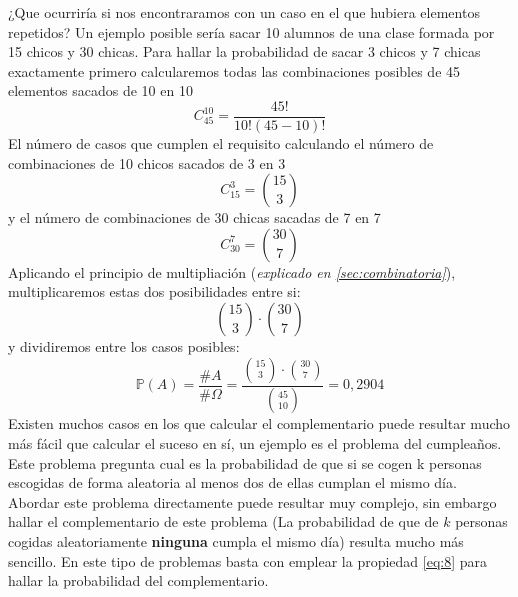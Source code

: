 \documentclass[11pt]{article}
\newcommand{\prob}{\mathbb{P}}
\newcommand{\OMG}{\varOmega}
\theoremstyle{plain}
\begin{document}
                 ¿Que ocurriría si nos encontraramos con un caso en el que hubiera elementos repetidos? Un ejemplo posible sería sacar 10 alumnos de una clase formada por 15 chicos y 30 chicas. Para hallar la probabilidad de sacar 3 chicos y 7 chicas exactamente primero calcularemos todas las combinaciones posibles de 45 elementos sacados de 10 en 10 \[C_{45}^{10} =\frac{45!}{10!(45-10)!} \] El número de casos que cumplen el requisito calculando el número de combinaciones de 10 chicos sacados de 3 en 3 \[C_{15}^3 = \binom{15}{3}\] y el número de combinaciones de 30 chicas sacadas de 7 en 7 \[C_{30}^7  = \binom{30}{7}\] Aplicando el principio de multipliación (\textit{explicado en \ref{sec:combinatoria}}), multiplicaremos estas dos posibilidades entre si: \[\binom{15}{3} \cdot \binom{30}{7}\] y dividiremos entre los casos posibles: 
                 \begin{equation}
                     \prob (A) = \frac{\# A}{\#\OMG} = \frac{\binom{15}{3} \cdot \binom{30}{7}}{\binom{45}{10}} = 0,2904
                 \end{equation}
                Existen muchos casos en los que calcular el complementario puede resultar mucho más fácil que calcular el suceso en sí, un ejemplo es el problema del cumpleaños. Este problema pregunta cual es la probabilidad de que si se cogen k personas escogidas de forma aleatoria al menos dos de ellas cumplan el mismo día. Abordar este problema directamente puede resultar muy complejo, sin embargo hallar el complementario de este problema (La probabilidad de que de $k$ personas cogidas aleatoriamente \textbf{ninguna} cumpla el mismo día) resulta mucho más sencillo. En este tipo de problemas basta con emplear la propiedad \ref{eq:8} para hallar la probabilidad del complementario.
\end{document}
